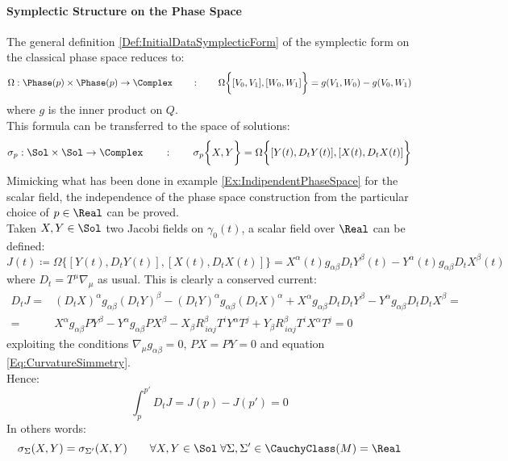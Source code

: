 \documentclass[Main]{subfiles}
\begin{document}
			\paragraph{Symplectic Structure on the Phase Space}		
				The general definition \ref{Def:InitialDataSymplecticForm} of the symplectic form on the classical phase space reduces to:
				\begin{displaymath}
					\Omega: \Phase(p) \times \Phase(p) \rightarrow \Complex \qquad : \qquad 					
					\Omega \biggr\{ [V_0,V_1] , [W_0, W_1] \biggr\} = g(V_1,W_0)  - g( V_0, W_1) 
				\end{displaymath}
				where $g$ is the inner product on $Q$.
				\\
				This formula can be transferred to the space of solutions:
				\begin{displaymath}
					\sigma_p: \Sol \times \Sol \rightarrow \Complex \qquad : \qquad 					
					\sigma_p \biggr\{X, Y  \biggr\} = \Omega \biggr\{ [Y(t), D_t Y(t)] , [X(t), D_t X(t)] \biggr\}
				\end{displaymath}
				\vspace{3mm}
				Mimicking what has been done in example \ref{Ex:IndipendentPhaseSpace} for the scalar field, the independence of the phase space construction from the particular choice of $p \in \Real$ can be proved.\\
				Taken $X,Y \in \Sol$ two Jacobi fields on $\gamma_0(t)$, a scalar field over $\Real$ can be defined:
				\begin{displaymath}
					J(t) \coloneqq \Omega \biggr\{ [Y(t), D_t Y(t)] , [X(t), D_t X(t)] \biggr\}
					= X^\alpha(t) g_{\alpha \beta} D_t Y^\beta(t) - 
					Y^\alpha(t) g_{\alpha \beta} D_t X^\beta(t) 					
				\end{displaymath}
				where $D_t = T^\mu \nabla_\mu$ as usual.
				This is clearly a conserved current:
				\begin{eqnarray}
					D_t J =& (D_t X)^\alpha g_{\alpha \beta} (D_t Y)^\beta - (D_t Y)^\alpha g_{\alpha \beta} (D_t X)^\alpha + X^\alpha g_{\alpha \beta} D_t D_t Y^\beta - Y^\alpha g_{\alpha \beta} D_t D_t X^\beta = \nonumber \\
					=& X^\alpha g_{\alpha \beta} PY^\beta - Y^\alpha g_{\alpha \beta} PX^\beta - X_\beta R^\beta _{\, i \alpha j}T^i Y^\alpha T^j +Y_\beta R^\beta _{\, i \alpha j}T^i X^\alpha T^j  = 0
				\end{eqnarray}
				exploiting the conditions $\nabla_\mu g_{\alpha \beta}=0$, $PX=PY=0$ and equation \ref{Eq:CurvatureSimmetry}.\\
				Hence:
				\begin{displaymath}
				\int_p^{p'} D_t J = J(p) - J(p') = 0
				\end{displaymath}
			In others words:
			\begin{displaymath}
				\sigma_\Sigma (X, Y) = \sigma_{\Sigma'} (X, Y) 
				\qquad \forall X, Y \in \Sol \; \forall \Sigma, \Sigma' \in \CauchyClass(M)= \Real
			\end{displaymath}
			
\end{document}

